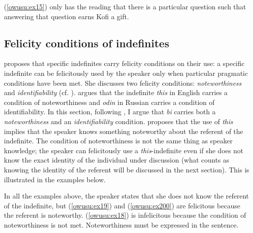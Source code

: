 \documentclass[output=paper,modfonts,nonflat,draftmode]{langsci/langscibook}
\begin{document}
(\ref{owusu:ex15}) only has the reading that there is a particular question such that answering that question earns Kofi a gift. 

\subsection{Felicity conditions of indefinites}

\citet{Ionin2006} proposes that specific indefinites carry felicity conditions on their use: a specific indefinite can be felicitously used by the speaker only when particular pragmatic conditions have been met. She discusses two felicity conditions: \emph{noteworthiness} and \emph{identifiability} (cf. \citealt{AbuschRooth1997,Farkas2002b}). \citet{Ionin2013} argues that the indefinite \emph{this} in English carries a condition of noteworthiness and \emph{odin} in Russian carries a condition of identifiability. In this section, following \citet{Ionin2013}, I  argue that \emph{bi} carries both a \emph{noteworthiness} and an \emph{identifiability} condition. \citet{Ionin2006} proposes that the use of \emph{this} implies that the speaker knows something noteworthy about the referent of the indefinite. The condition of noteworthiness is not the same thing as speaker knowledge; the speaker can felicitously use a \emph{this}-indefinite even if she does not know the exact identity of the individual under discussion (what counts as knowing the identity of the referent will be discussed in the next section). This is illustrated in the examples below. 
\ea {}\\

 \label{owusu:ex18}

\label{owusu:ex19}
 \label{owusu:ex200}

\z
\z

In all the examples above, the speaker states that she does not know the referent of the indefinite, but (\ref{owusu:ex19}) and (\ref{owusu:ex200}) are felicitous because the referent is noteworthy. (\ref{owusu:ex18}) is infelicitous because the condition of noteworthiness is not met. Noteworthiness must be expressed in the sentence.
\end{document}
